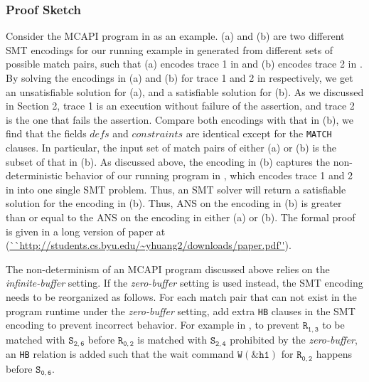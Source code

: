 \subsubsection{Proof Sketch}
Consider the MCAPI program in  as an example.
(a) and (b) are two different SMT encodings for our running
example in  generated from different sets of possible match pairs, such that (a) encodes trace 1 in  and (b) encodes trace 2 in . By solving the encodings in (a) and (b) for trace 1 and 2 in  respectively, we get an unsatisfiable solution for (a), and a satisfiable solution for (b). As we discussed in Section 2, trace 1 is an execution without failure of the assertion, and trace 2 is the one that fails the assertion. %
Compare both encodings with that in (b), we find that the fields $\mathit{defs}$ and $\mathit{constraints}$ are identical except for the \texttt{MATCH} clauses. In particular, the input set of match pairs of either (a) or (b) is the subset of that in (b). As discussed above, the encoding in (b) captures the non-deterministic behavior of our running program in , which encodes trace 1 and 2 in  into one single SMT problem. Thus, an SMT solver will return a satisfiable solution for the encoding in (b). Thus, $\mathrm{ANS}$ on the encoding in (b) is greater than or equal to the $\mathrm{ANS}$ on the encoding in either (a) or (b). The formal proof is given in a long version of paper at (\url{``http://students.cs.byu.edu/~yhuang2/downloads/paper.pdf''}).

The non-determinism of an MCAPI program discussed above relies on the \textit{infinite-buffer} setting. If the \textit{zero-buffer} setting is used instead, the SMT encoding needs to be reorganized as follows. For each match pair that can not exist in the program runtime under the \textit{zero-buffer} setting, add extra \texttt{HB} clauses in the SMT encoding to prevent incorrect behavior. For example in , to prevent $\mathtt{R_{1,3}}$ to be matched with $\mathtt{S_{2,6}}$ before $\mathtt{R_{0,2}}$ is matched with $\mathtt{S_{2,4}}$ prohibited by the \textit{zero-buffer}, an \texttt{HB} relation is added such that the wait command $\mathtt{W(\&h1)}$ for $\mathtt{R_{0,2}}$ happens before $\mathtt{S_{0,6}}$.













